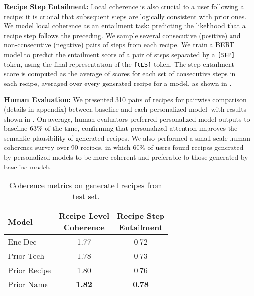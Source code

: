 \documentclass[11pt,a4paper]{article}
\begin{document}
\noindent
\textbf{Recipe Step Entailment:}
Local coherence is also crucial to a user following a recipe: it is crucial that subsequent steps are logically consistent with prior ones.
We model local coherence as an entailment task: predicting the likelihood that a recipe step follows the preceding.
We sample several consecutive (positive) and non-consecutive (negative) pairs of steps from each recipe.
We train a BERT \cite{DBLP:conf/naacl/DevlinCLT19} model to predict the entailment score of a pair of steps separated by a \texttt{[SEP]} token, using the final representation of the \texttt{[CLS]} token.
The step entailment score is computed as the average of scores for each set of consecutive steps in each recipe, averaged over every generated recipe for a model, as shown in .
\medskip


\noindent
\textbf{Human Evaluation:}
We presented 310 pairs of recipes for pairwise comparison \cite{DBLP:conf/acl/LewisDF18} (details in appendix) between baseline and each personalized model, with results shown in .
On average, human evaluators preferred personalized model outputs to baseline 63\% of the time, confirming that personalized attention improves the semantic plausibility of generated recipes.
We also performed a small-scale human coherence survey over 90 recipes, in which 60\% of users found recipes generated by personalized models to be more coherent and preferable to those generated by baseline models. 

\begin{table}[t!]
\small
\centering
\begin{tabular}{@{}lcc@{}}
\toprule
\bf Model       & \bf \thead{Recipe Level\\Coherence}      & \bf \thead{Recipe Step\\ Entailment}  \\ \midrule
Enc-Dec         & 1.77                              & 0.72                                           \\  \midrule
Prior Tech      & 1.78                              & 0.73                                                \\
Prior Recipe    & 1.80                              & 0.76                                             \\
Prior Name      & \textbf{1.82}                     & \textbf{0.78}                                      \\ \bottomrule
\end{tabular}
\caption{Coherence metrics on generated recipes from test set.}
\label{tab:coherence_metrics}
\end{table}
\end{document}
